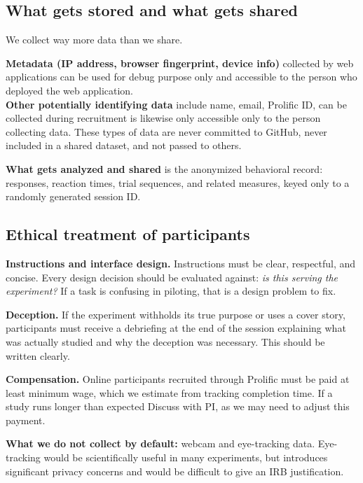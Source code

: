 \documentclass[11pt, letterpaper]{article}
\begin{document}
\subsection{What gets stored and what gets shared}

We collect way more data than we share.

\textbf{Metadata (IP address, browser fingerprint, device info)} collected
by web applications can be used for debug purpose only and accessible to the person
who deployed the web application. \\
\textbf{Other potentially identifying data} include name, email, Prolific ID, can be collected during recruitment is likewise only accessible only to the person collecting data. These types of data are never committed to GitHub, never included in a shared dataset, and not passed to others. 

\textbf{What gets analyzed and shared} is the anonymized behavioral record:
responses, reaction times, trial sequences, and related measures, keyed only to a
randomly generated session ID. 

\subsection{Ethical treatment of participants}

\textbf{Instructions and interface design.} Instructions must be clear, respectful,
and concise. Every design decision should be evaluated against: \emph{is this
serving the experiment?} If a task is confusing in piloting, that is a design problem to fix.

\textbf{Deception.} If the experiment withholds its true purpose or uses a cover
story, participants must receive a debriefing at the end of the session explaining
what was actually studied and why the deception was necessary. This should be written clearly.

\textbf{Compensation.} Online participants recruited through Prolific must be paid
at least minimum wage, which we estimate from tracking completion time. If a study runs longer than expected Discuss with PI, as we may need to adjust this payment.


\textbf{What we do not collect by default:} webcam and eye-tracking data.
Eye-tracking would be scientifically useful in many experiments, but introduces
significant privacy concerns and would be difficult to give an IRB justification. 
\end{document}

